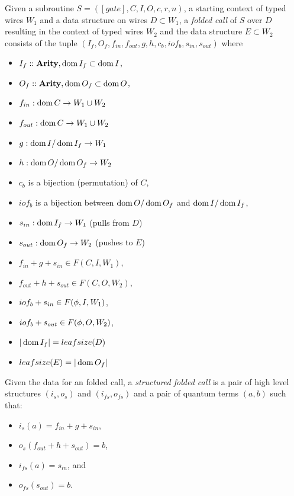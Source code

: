 \begin{definition}\label{def:subroutine_fold}
  Given a subroutine $S=([gate],C,I,O,c,r,n)$, a starting context of
  typed wires $W_1$ and a data structure on wires $D\subset W_1$, a
  \emph{folded call} of $S$ over $D$ resulting in the context of typed wires
  $W_2$ and the data structure $E\subset W_2$ consists of the tuple
  $(I_f,O_f, f_{in}, f_{out}, g, h, c_b, iof_b, s_{in}, s_{out} )$ where
  \begin{itemize}
    \item $I_f::\mathbf{{Arity}}, \operatorname*{dom}{I_f} \subset \operatorname*{dom}{I}$,
    \item $O_f::\mathbf{{Arity}}, \operatorname*{dom}{O_f} \subset \operatorname*{dom}{O}$,
    \item $f_{in}:\operatorname*{dom} C \to W_1\cup W_2$
    \item $f_{out}:\operatorname*{dom} C \to W_1\cup W_2$
    \item $g:\operatorname*{dom} I / \operatorname*{dom}{I_f} \to W_1$
    \item $h:\operatorname*{dom} O /\operatorname*{dom}{O_f} \to W_2$
    \item $c_b$ is a bijection (permutation) of $C$,
    \item $iof_b$ is a bijection between $\operatorname*{dom}{O}/\operatorname*{dom}{O_f}$
      and $\operatorname*{dom}{I}/\operatorname*{dom}{I_f}$,
    \item $s_{in}: \operatorname*{dom}{I_f} \to W_1$ (pulls from $D$)
    \item $s_{out}: \operatorname*{dom}{O_f} \to W_2$ (pushes to $E$)
    \item $f_{in}+ g+ s_{in} \in F(C,I,W_1)$,
    \item $f_{out}+ h + s_{out} \in F(C,O,W_2)$,
    \item $iof_b + s_{in} \in F(\phi,I,W_1)$,
    \item $iof_b + s_{out} \in F(\phi,O,W_2)$,
    \item $|\operatorname*{dom}{I_f}| = leafsize(D)$
    \item $leafsize(E) = |\operatorname*{dom}{O_f}|$
  \end{itemize}

\end{definition}

\begin{definition}\label{def:structured_folded_call}
  Given the data for an folded call,
  a \emph{structured folded call} is a pair of high level structures
  $(i_s,o_s)$ and $(i_{fs},o_{fs})$  and a pair of quantum
  terms $(a,b)$ such that:
  \begin{itemize}
    \item $i_s(a) = f_{in}+g + s_{in}$,
    \item $o_s(f_{out} + h + s_{out}) = b$,
    \item $i_{fs}(a) = s_{in}$, and
    \item $o_{fs}(s_{out}) = b$.
  \end{itemize}

\end{definition}

